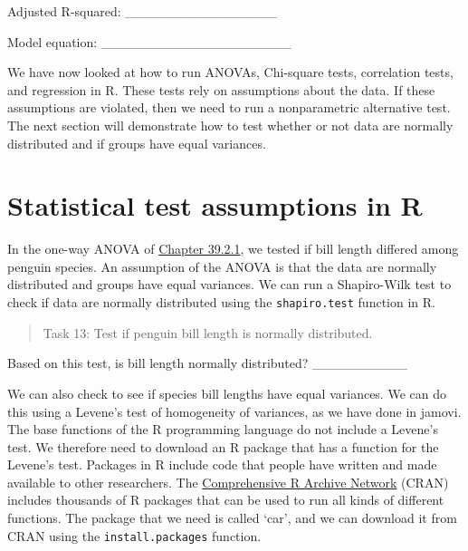 \documentclass[
]{scrbook}
\newenvironment{Shaded}{\begin{snugshade}}{\end{snugshade}}
\newcommand{\AttributeTok}[1]{\textcolor[rgb]{0.77,0.63,0.00}{#1}}
\newcommand{\FunctionTok}[1]{\textcolor[rgb]{0.00,0.00,0.00}{#1}}
\newcommand{\NormalTok}[1]{#1}
\newcommand{\SpecialCharTok}[1]{\textcolor[rgb]{0.00,0.00,0.00}{#1}}
\begin{document}
Adjusted R-squared: \_\_\_\_\_\_\_\_\_\_\_\_\_\_\_\_

Model equation: \_\_\_\_\_\_\_\_\_\_\_\_\_\_\_\_\_\_\_\_

We have now looked at how to run ANOVAs, Chi-square tests, correlation tests, and regression in R.
These tests rely on assumptions about the data.
If these assumptions are violated, then we need to run a nonparametric alternative test.
The next section will demonstrate how to test whether or not data are normally distributed and if groups have equal variances.

\hypertarget{statistical-test-assumptions-in-r}{%
\section{Statistical test assumptions in R}\label{statistical-test-assumptions-in-r}}

In the one-way ANOVA of \protect\hyperlink{one-way-anova-in-r}{Chapter 39.2.1}, we tested if bill length differed among penguin species.
An assumption of the ANOVA is that the data are normally distributed and groups have equal variances.
We can run a Shapiro-Wilk test to check if data are normally distributed using the \texttt{shapiro.test} function in R.

\begin{Shaded}
\end{Shaded}

\begin{quote}
Task 13: Test if penguin bill length is normally distributed.
\end{quote}

Based on this test, is bill length normally distributed? \_\_\_\_\_\_\_\_\_\_

We can also check to see if species bill lengths have equal variances.
We can do this using a Levene's test of homogeneity of variances, as we have done in jamovi.
The base functions of the R programming language do not include a Levene's test.
We therefore need to download an R package that has a function for the Levene's test.
Packages in R include code that people have written and made available to other researchers.
The \href{https://cran.r-project.org/}{Comprehensive R Archive Network} (CRAN) includes thousands of R packages that can be used to run all kinds of different functions.
The package that we need is called `car', and we can download it from CRAN using the \texttt{install.packages} function.
\end{document}
